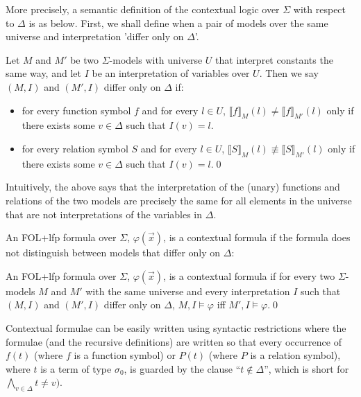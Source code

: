 More precisely, a semantic definition of the contextual logic over $\Sigma$ with respect 
to $\Delta$ is as below. First, we shall define when a pair of models over the same
universe and interpretation 'differ only on $\Delta$'.

\begin{definition}
Let $M$ and $M'$  be two $\Sigma$-models with universe $U$ that interpret constants the same way,
and let $I$ be an interpretation of variables over $U$.
Then we say $(M, I)$ and $(M', I)$ differ only on $\Delta$ if:
\begin{itemize}
	\item  for every
	function symbol $f$ and for every $l \in U$, $\llbracket f \rrbracket_M(l)  \not = \llbracket f \rrbracket_{M'}(l)$ only if
	there exists some $v \in \Delta$ such that $I(v) = l$.
	
	\item  for every relation symbol $S$ and for every $l \in U$, $\llbracket S \rrbracket_M(l)  \not \equiv \llbracket S \rrbracket_{M'}(l) $ only if 
there exists some $v \in \Delta$ such that $I(v) = l$.\qed	
\end{itemize}
\end{definition}

Intuitively, the above says that the interpretation of the (unary) functions and relations of the two models are 
precisely the same for all elements in the universe that are not interpretations of the variables in $\Delta$.

An FOL+lfp formula over $\Sigma$, $\varphi(\vec{x})$, is a contextual formula
if the formula does not distinguish between models that differ only on $\Delta$:


\begin{definition}
An FOL+lfp formula over $\Sigma$, $\varphi(\vec{x})$, is a contextual formula
if for every two $\Sigma$-models $M$ and $M'$ with the same universe and every interpretation $I$ 
such that $(M, I)$ and $(M', I)$ differ only on $\Delta$, 
$M, I \models \varphi$ iff $M', I \models \varphi$.\qed
\end{definition}

Contextual formulae can be easily written using syntactic restrictions where the formulae (and the recursive definitions)
are written so that every occurrence of $f(t)$ (where $f$ is a function symbol) or $P(t)$ (where $P$ is a relation symbol),
where $t$ is a term of type $\sigma_0$, 
is guarded by the clause ``$t \not \in \Delta$'', which is short for $\bigwedge_{v \in \Delta} t \not = v)$.


